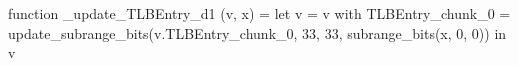 function _update_TLBEntry_d1 (v, x) = let v = { v with TLBEntry_chunk_0 = update_subrange_bits(v.TLBEntry_chunk_0, 33, 33, subrange_bits(x, 0, 0)) } in
  v
